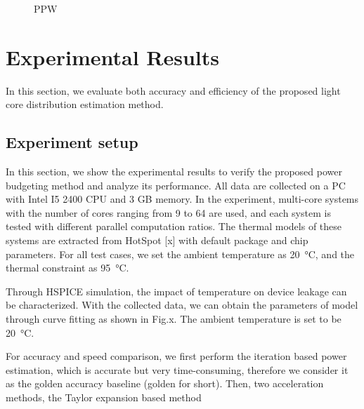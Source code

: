 \begin{figure}[htb]
\centering
{}%
%
\caption{PPW}  
\label{fig:ppw}
\end{figure}


\section{Experimental Results}

In this section, we evaluate both accuracy and efficiency of the proposed light core distribution estimation method.

\subsection{Experiment setup}
In this section, we show the experimental results to verify the proposed power budgeting method and analyze its performance. All data are collected on a PC with Intel I5 2400 CPU and 3 GB memory. In the experiment, multi-core systems with the number of cores ranging from 9 to 64 are used, and each system is tested with different parallel computation ratios. The thermal models of these systems are extracted from HotSpot [x] with default package and chip parameters. For all test cases, we set the ambient temperature as \SI{20}{\degreeCelsius}, and the thermal constraint as \SI{95}{\degreeCelsius}. 

Through HSPICE simulation, the impact of temperature on device leakage can be characterized. With the collected data, we can obtain the parameters of model through curve fitting as shown in Fig.x. The ambient temperature is set to be \SI{20}{\degreeCelsius}.

For accuracy and speed comparison, we first perform the iteration based power estimation, which is accurate but very time-consuming, therefore we consider it as the golden accuracy baseline (golden for short). Then, two acceleration methods, the Taylor expansion based method 